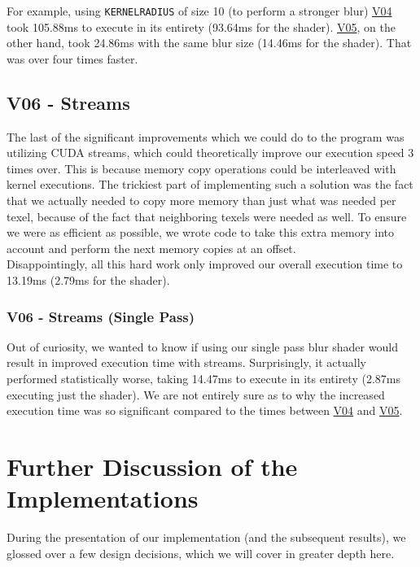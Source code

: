 \documentclass[10pt,journal,compsoc]{IEEEtran}
\def\code#1{\texttt{#1}}
\begin{document}
\noindent For example, using \code{KERNELRADIUS} of size 10 (to perform a stronger blur) \hyperref[sec:V04]{V04} took 105.88ms to execute in its entirety (93.64ms for the shader). \hyperref[sec:V05]{V05}, on the other hand, took 24.86ms with the same blur size (14.46ms for the shader). That was over four times faster. \\


\subsection{V06 - Streams}
\label{sec:V06}

\noindent The last of the significant improvements which we could do to the program was utilizing CUDA streams, which could theoretically improve our execution speed 3 times over. This is because memory copy operations could be interleaved with kernel executions. The trickiest part of implementing such a solution was the fact that we actually needed to copy more memory than just what was needed per texel, because of the fact that neighboring texels were needed as well. To ensure we were as efficient as possible, we wrote code to take this extra memory into account and perform the next memory copies at an offset.\\

\noindent Disappointingly, all this hard work only improved our overall execution time to 13.19ms (2.79ms for the shader). 


\subsubsection{V06 - Streams (Single Pass)}

\noindent Out of curiosity, we wanted to know if using our single pass blur shader would result in improved execution time with streams. Surprisingly, it actually performed statistically worse, taking 14.47ms to execute in its entirety (2.87ms executing just the shader). We are not entirely sure as to why the increased execution time was so significant compared to the times between \hyperref[sec:V04]{V04} and \hyperref[sec:V05]{V05}. \\


\section{Further Discussion of the Implementations}

\noindent During the presentation of our implementation (and the subsequent results), we glossed over a few design decisions, which we will cover in greater depth here. 
\end{document}
